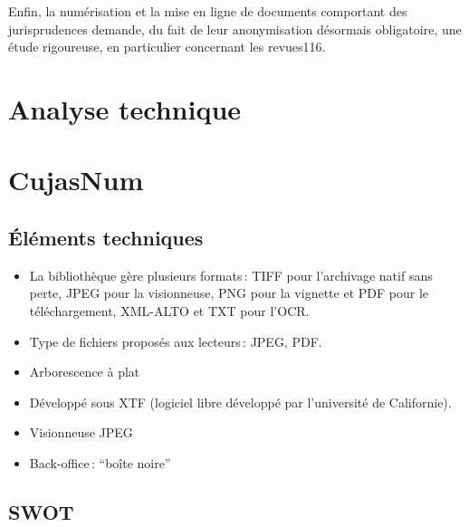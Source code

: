 Enfin, la numérisation et la mise en ligne de documents comportant des jurisprudences demande, du fait de leur anonymisation désormais obligatoire, une étude rigoureuse, en particulier concernant les revues116.  



\section*{Analyse technique}

\section{CujasNum}

\subsection{Éléments techniques} 
\begin{itemize}
	\item La bibliothèque gère plusieurs formats :  TIFF pour l’archivage natif sans perte, JPEG pour la visionneuse, PNG pour la vignette et PDF pour le téléchargement, XML-ALTO et TXT pour l’OCR.
\item Type de fichiers proposés aux lecteurs : JPEG, PDF. 
\item Arborescence à plat 
\item Développé sous XTF (logiciel libre développé par l’université de Californie). 
\item Visionneuse JPEG 
\item Back-office : \enquote{boîte noire} 
\end{itemize}
\vfill

\subsection{SWOT}

